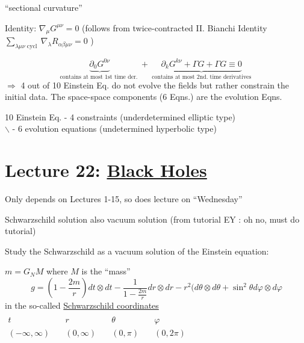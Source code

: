 	``sectional curvature''
	
	Identity: $\nabla_{\mu} G^{\mu \nu} =0$ (follows from twice-contracted II. Bianchi Identity \\
	 $\sum_{\lambda \mu \nu \text{ cycl } } \nabla_{\lambda} R_{\alpha \beta \mu \nu } = 0 $ )
	
	\[
	\underbrace{ \partial_0 G^{0\nu} }_{\text{contains at most 1st time der. }} + \underbrace{ \partial_k G^{k\nu} + \Gamma G  + \Gamma G \equiv0 }_{\text{ contains at most 2nd. time derivatives }}
	\]
	$\Longrightarrow$ 4 out of 10 Einstein Eq. do not evolve the fields but rather constrain the initial data. The space-space components (6 Eqns.) are the evolution Eqns.  
	
	10 Einstein Eq. - 4 constraints (underdetermined elliptic type) \\
	\phantom{10 Einstein Eq.\quad \, } $\backslash$ - 6 evolution equations (undetermined hyperbolic type)
	
	\section{}
	
	\section{}
	
	\section{}
	
	\section{Lecture 22: \underline{Black Holes}}
	
	Only depends on Lectures 1-15, so does lecture on ``Wednesday''
	
	Schwarzschild solution also vacuum solution (from tutorial EY : oh no, must do tutorial)
	
	Study the Schwarzschild as a vacuum solution of the Einstein equation:
	
	$m = G_N M$ where $M$ is the ``mass''
	\[
	g = \left( 1 - \frac{2m}{r} \right) dt \otimes dt - \frac{1}{ 1 - \frac{2m}{r} } dr \otimes dr - r^2 ( d\theta \otimes d\theta + \sin^2{\theta} d\varphi \otimes d\varphi
	\]
	in the so-called \underline{Schwarzschild coordinates}  $\begin{aligned} & & & & \quad \\
	t \quad & r \quad & \theta \quad & \varphi \\ 
	(-\infty,\infty) \quad & (0,\infty) \quad & (0,\pi) \quad & (0,2\pi) \end{aligned}$
	
